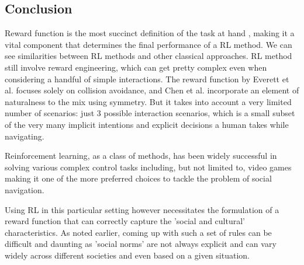 \subsection*{Conclusion}

Reward function is the most succinct definition of the task at hand \cite{abbeel_apprenticeshiplearning_2004}, making it a vital component that determines the final performance of a RL method. We can see similarities between RL methods and other classical approaches. RL method still involve reward engineering, which can get pretty complex even when considering a handful of simple interactions. The reward function by Everett et al. \cite{everett_collision_2019} focuses solely on collision avoidance, and Chen et al. \cite{chen_socially_2017} incorporate an element of naturalness to the mix using symmetry. But it takes into account a very limited number of scenarios: just 3 possible interaction scenarios, which is a small subset of the very many implicit intentions and explicit decisions a human takes while navigating.
 
Reinforcement learning, as a class of methods, has been widely successful in solving various complex control tasks including, but not limited to, video games making it one of the more preferred choices to tackle the problem of social navigation. \par
Using RL in this particular setting however necessitates the formulation of a reward function that can correctly capture the 'social and cultural' characteristics. As noted earlier, coming up with such a set of rules can be difficult and daunting as 'social norms' are not always explicit and can vary widely across different societies and even based on a given situation.\\

